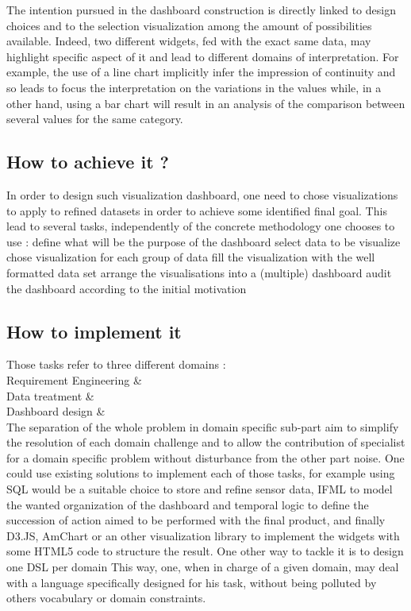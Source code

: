 \documentclass{acm_proc_article-sp}
\begin{document}
The intention pursued in the dashboard construction is directly linked to design
choices and to the selection visualization among the amount of possibilities available.
Indeed, two different widgets, fed with the exact same data, may highlight specific
aspect of it and lead to different domains of interpretation. For example,
the use of a line chart implicitly infer the impression of continuity and so leads
to focus the interpretation on the variations in the values while, in a other hand,
using a bar chart will result in an analysis of the comparison between several values
for the same category.

\subsection{How to achieve it ?}
In order to design such visualization dashboard, one need to chose visualizations
to apply to refined datasets in order to achieve some identified final goal.
This lead to several tasks, independently of the concrete methodology one chooses to use :
 define what will be the purpose of the dashboard
 select data to be visualize
 chose visualization for each group of data
 fill the visualization with the well formatted data set
 arrange the visualisations into a (multiple) dashboard
 audit the dashboard according to the initial motivation

\subsection{How to implement it}
Those tasks refer to three different domains :\\
Requirement Engineering  \& \\
Data treatment  \& \\
Dashboard design  \& \\
The separation of the whole problem in domain specific sub-part aim to simplify
the resolution of each domain challenge and to allow the contribution of specialist
for a domain specific problem without disturbance from the other part noise.
One could use existing solutions to implement each of those tasks, for example
using SQL would be a suitable choice to store and refine sensor data, IFML to
model the wanted organization of the dashboard and temporal logic to define
the succession of action aimed to be performed with the final product, and finally
D3.JS, AmChart or an other visualization library to implement the widgets
with some HTML5 code to structure the result.
One other way to tackle it is to design one DSL per domain
This way, one, when in charge of a given domain, may deal with a language
specifically designed for his task, without being polluted by others
vocabulary or domain constraints.
\end{document}
